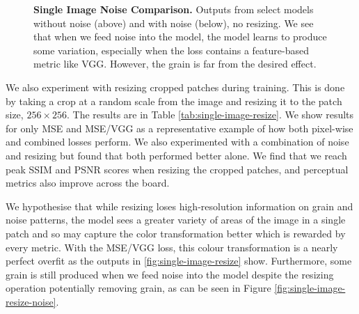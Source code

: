 \begin{figure}
      \centering

    \caption{\textbf{Single Image Noise Comparison.} Outputs from select models without noise (above) and with noise (below), no resizing. We see that when we feed noise into the model, the model learns to produce some variation, especially when the loss contains a feature-based metric like VGG. However, the grain is far from the desired effect.}
    \label{fig:single-image-noise-no-noise}
\end{figure}

We also experiment with resizing cropped patches during training. This is done by taking a crop at a random scale from the image and resizing it to the patch size, $ 256 \times 256$. The results are in Table \ref{tab:single-image-resize}. We show results for only MSE and MSE/VGG as a representative example of how both pixel-wise and combined losses perform. We also experimented with a combination of noise and resizing but found that both performed better alone.  We find that we reach peak SSIM and PSNR scores when resizing the cropped patches, and perceptual metrics also improve across the board.

We hypothesise that while resizing loses high-resolution information on grain and noise patterns, the model sees a greater variety of areas of the image in a single patch and so may capture the color transformation better which is rewarded by every metric. With the MSE/VGG loss, this colour transformation is a nearly perfect overfit as the outputs in \ref{fig:single-image-resize} show. Furthermore, some grain is still produced when we feed noise into the model despite the resizing operation potentially removing grain, as can be seen in Figure \ref{fig:single-image-resize-noise}.


